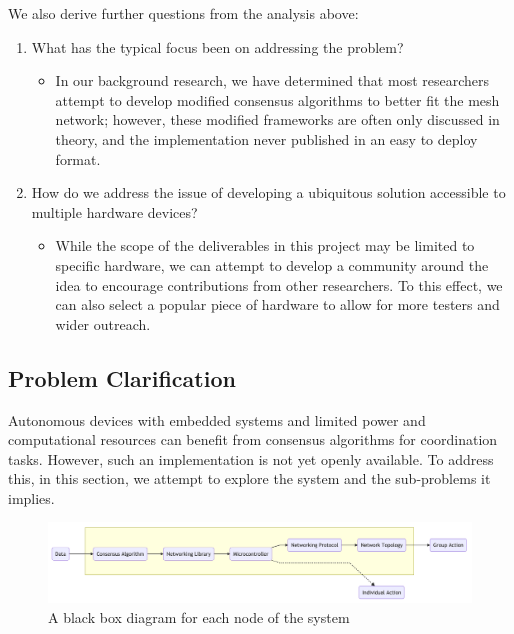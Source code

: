 We also derive further questions from the analysis above:

\begin{enumerate}

    \item What has the typical focus been on addressing the problem?
    \begin{itemize}
        \item In our background research, we have determined that most researchers attempt to develop modified consensus algorithms to better fit the mesh network; however, these modified frameworks are often only discussed in theory, and the implementation never published in an easy to deploy format.
    \end{itemize}
    
    \item How do we address the issue of developing a ubiquitous solution accessible to multiple hardware devices?
    \begin{itemize}
        \item While the scope of the deliverables in this project may be limited to specific hardware, we can attempt to develop a community around the idea to encourage contributions from other researchers. To this effect, we can also select a popular piece of hardware to allow for more testers and wider outreach.
    \end{itemize}
\end{enumerate}



\subsection{Problem Clarification}

Autonomous devices with embedded systems and limited power and computational resources can benefit from consensus algorithms for coordination tasks. However, such an implementation is not yet openly available. To address this, in this section, we attempt to explore the system and the sub-problems it implies.

\begin{figure}[H]
    \centering
    \includegraphics[width=0.90\columnwidth]{final-proposal/images/blackbox.png}
    \caption{A black box diagram for each node of the system}
    \label{fig:black_box}

\end{figure}

